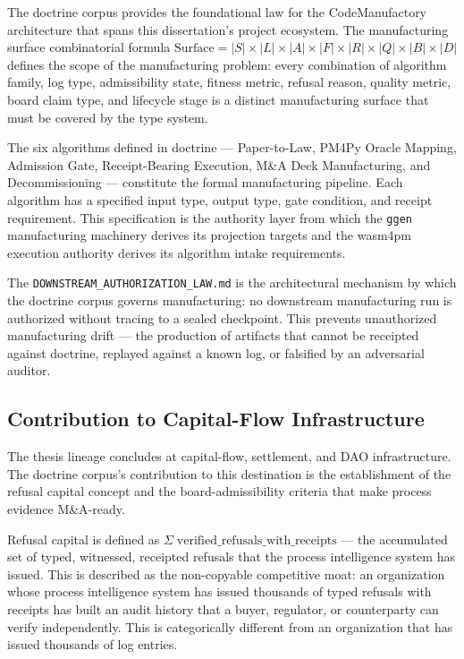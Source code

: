 The doctrine corpus provides the foundational law for the CodeManufactory architecture that
spans this dissertation's project ecosystem. The manufacturing surface combinatorial formula
$\text{Surface} = |S| \times |L| \times |A| \times |F| \times |R| \times |Q| \times |B|
\times |D|$ defines the scope of the manufacturing problem: every combination of algorithm
family, log type, admissibility state, fitness metric, refusal reason, quality metric, board
claim type, and lifecycle stage is a distinct manufacturing surface that must be covered by
the type system.

The six algorithms defined in doctrine --- Paper-to-Law, PM4Py Oracle Mapping, Admission
Gate, Receipt-Bearing Execution, M\&A Deck Manufacturing, and Decommissioning --- constitute
the formal manufacturing pipeline. Each algorithm has a specified input type, output type,
gate condition, and receipt requirement. This specification is the authority layer from which
the \texttt{ggen} manufacturing machinery derives its projection targets and the wasm4pm
execution authority derives its algorithm intake requirements.

The \texttt{DOWNSTREAM\_AUTHORIZATION\_LAW.md} is the architectural mechanism by which the
doctrine corpus governs manufacturing: no downstream manufacturing run is authorized without
tracing to a sealed checkpoint. This prevents unauthorized manufacturing drift --- the
production of artifacts that cannot be receipted against doctrine, replayed against a known
log, or falsified by an adversarial auditor.

\subsection{Contribution to Capital-Flow Infrastructure}
\label{sec:doctrine-contribution-capital}

The thesis lineage concludes at capital-flow, settlement, and DAO infrastructure. The
doctrine corpus's contribution to this destination is the establishment of the refusal capital
concept and the board-admissibility criteria that make process evidence M\&A-ready.

Refusal capital is defined as $\Sigma \; \text{verified\_refusals\_with\_receipts}$ --- the
accumulated set of typed, witnessed, receipted refusals that the process intelligence system
has issued. This is described as the non-copyable competitive moat: an organization whose
process intelligence system has issued thousands of typed refusals with receipts has built an
audit history that a buyer, regulator, or counterparty can verify independently. This is
categorically different from an organization that has issued thousands of log entries.

